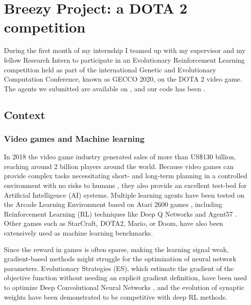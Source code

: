 \chapter{Breezy Project: a DOTA 2 competition}
\label{chap:dota}

During the first month of my internship I teamed up with my supervisor  and my fellow Research Intern  to participate in an Evolutionary Reinforcement Learning competition held as part of the international Genetic and Evolutionary Computation Conference, known as GECCO 2020, on the DOTA 2 video game. \\
The agents we submitted are available on , and our code has been .

\section{Context}
\subsection{Video games and Machine learning}
In 2018 the video game industry generated sales of more than US\$130 billion, reaching around 2 billion players around the world. Because video games can provide complex tasks necessitating short- and long-term planning in a controlled environment with no risks to humans \cite{Games_AI}, they also provide an excellent test-bed for Artificial Intelligence (AI) systems. Multiple learning agents have been tested on the Arcade Learning Environment based on Atari 2600 games \cite{Atari}, including Reinforcement Learning (RL) techniques like Deep Q Networks \cite{DQN} and Agent57 \cite{agent57}. Other games such as StarCraft, DOTA2, Mario, or Doom, have also been extensively used as machine learning benchmarks.

Since the reward in games is often sparse, making the learning signal weak, gradient-based methods might struggle for the optimization of neural network parameters. Evolutionary Strategies (ES), which estimate the gradient of the objective function without needing an explicit gradient definition, have been used to optimize Deep Convolutional Neural Networks \cite{CMAES_DL}, and the evolution of synaptic weights have been demonstrated to be competitive with deep RL methods\cite{deep_neuroevo}.\\

